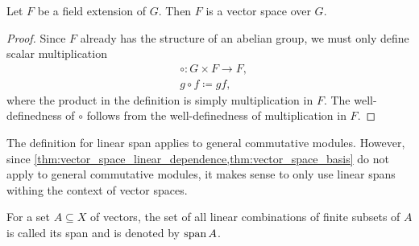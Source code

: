 \begin{proposition}\label{thm:field_extension_is_vector_space}
  Let \( F \) be a field extension of \( G \). Then \( F \) is a vector space over \( G \).
\end{proposition}
\begin{proof}
  Since \( F \) already has the structure of an abelian group, we must only define scalar multiplication
  \begin{align*}
    &\circ: G \times F \to F, \\
    &g \circ f \coloneqq gf,
  \end{align*}
  where the product in the definition is simply multiplication in \( F \). The well-definedness of \( \circ \) follows from the well-definedness of multiplication in \( F \).
\end{proof}

\begin{remark}\label{remark:linear_span_only_for_vector_spaces}
  The definition for linear span applies to general commutative modules. However, since \cref{thm:vector_space_linear_dependence,thm:vector_space_basis} do not apply to general commutative modules, it makes sense to only use linear spans withing the context of vector spaces.
\end{remark}

\begin{definition}\label{def:linear_span}
  For a set \( A \subseteq X \) of vectors, the set of all linear combinations of finite subsets of \( A \) is called its span and is denoted by \( \operatorname{span}{A} \).
\end{definition}


